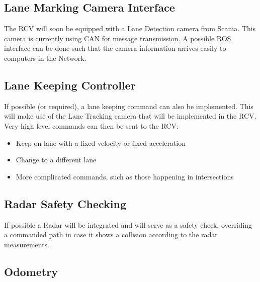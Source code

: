 \documentclass{article}
\begin{document}
\subsection{Lane Marking Camera Interface}

The RCV will soon be equipped with a Lane Detection camera from Scania. This camera is currently using CAN for message transmission. A possible ROS interface can be done such that the camera information arrives easily to computers in the Network.

\subsection{Lane Keeping Controller}

If possible (or required), a lane keeping command can also be implemented. This will make use of the Lane Tracking camera that will be implemented in the RCV. Very high level commands can then be sent to the RCV:

\begin{itemize}
\item Keep on lane with a fixed velocity or fixed acceleration
\item Change to a different lane
\item More complicated commands, such as those happening in intersections
\end{itemize}
	
%		
%	
%
%
%

\subsection{Radar Safety Checking}

If possible a Radar will be integrated and will serve as a safety check, overriding a commanded path in case it shows a collision according to the radar measurements.

\subsection{Odometry}
\end{document}
